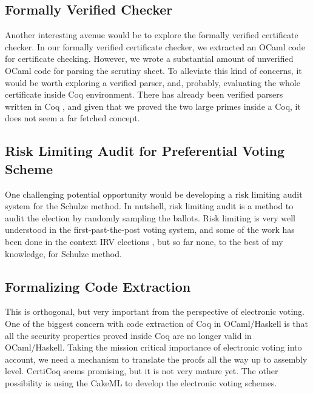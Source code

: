 \subsection{Formally Verified Checker}
Another interesting avenue would be to explore
the formally verified certificate checker.  In our formally verified 
certificate checker, we extracted an OCaml code for certificate checking. 
However, we wrote a substantial amount of unverified OCaml code 
for parsing the scrutiny sheet. To alleviate this kind of concerns, 
it would be worth exploring a verified parser, and, probably, 
evaluating the whole certificate inside Coq environment. 
There has already been verified parsers written in 
Coq \citep{10.1007/978-3-642-28869-2_20}, 
and given that we proved the two large primes inside a Coq, 
it does not seem a far fetched concept. 

\subsection{Risk Limiting Audit for Preferential Voting Scheme}
One challenging potential opportunity would be developing 
a risk limiting audit system for the Schulze method. In nutshell, 
risk limiting audit is a method to audit the election by 
randomly sampling the ballots. Risk limiting is very well 
understood in the first-past-the-post voting system, 
and some of the work has been done in the context 
IRV elections \citep{10.1007/978-3-030-00419-4_2},
but so far none, to the best of my knowledge, 
for Schulze method.

\subsection{Formalizing Code Extraction}
This is orthogonal, but very important from the perspective of 
electronic voting.  One of the biggest concern with code extraction of Coq in OCaml/Haskell 
is that all the security properties proved inside Coq are no longer valid 
in OCaml/Haskell. Taking the mission critical importance of electronic voting into account, 
we need a mechanism to translate the proofs all the way up to assembly level. 
CertiCoq \citep{anand2017certicoq} seems promising, but it is not very mature yet. The other possibility is 
using the CakeML \citep{Kumar:2014:CVI} to develop the electronic voting  
schemes. 





